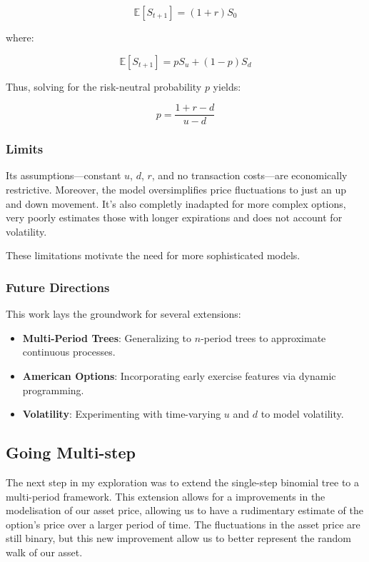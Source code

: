 \documentclass{article}
\begin{document}
    \[
        \mathbb{E}[S_{t+1}] = (1 + r) S_0
    \]


    where:

    \[
        \mathbb{E}[S_{t+1}] = p S_u + (1 - p) S_d
    \]

    Thus, solving for the risk-neutral probability \(p\) yields:

    \[
        p = \frac{1 + r - d}{u - d}
    \]

    \subsubsection{Limits}

    Its assumptions---constant \( u \), \( d \), \( r \), and no transaction costs---are economically restrictive.
    Moreover, the model oversimplifies price fluctuations to just an up and down movement.
    It's also completly inadapted for more complex options, very poorly estimates those with longer expirations and does not account for volatility.

    \medskip

    These limitations motivate the need for more sophisticated models.

    \subsubsection{Future Directions}

    This work lays the groundwork for several extensions:

    \begin{itemize}
        \item \textbf{Multi-Period Trees}: Generalizing to \( n \)-period trees to approximate continuous processes.
        \item \textbf{American Options}: Incorporating early exercise features via dynamic programming.
        \item \textbf{Volatility}: Experimenting with time-varying \( u \) and \( d \) to model volatility.
    \end{itemize}


    \subsection{Going Multi-step}

    The next step in my exploration was to extend the single-step binomial tree to a multi-period framework. 
    This extension allows for a improvements in the modelisation of our asset price, allowing us to have a rudimentary estimate of the option's price over a larger period of time.
    The fluctuations in the asset price are still binary, but this new improvement allow us to better represent the random walk of our asset.
\end{document}

